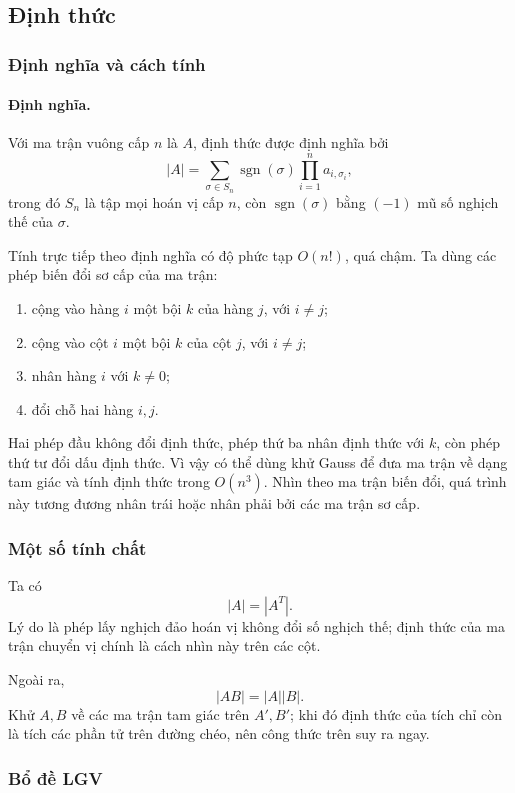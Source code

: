 \documentclass[11pt]{article}
\begin{document}
\subsection{Định thức}

\subsubsection{Định nghĩa và cách tính}

\paragraph{Định nghĩa.}
Với ma trận vuông cấp \(n\) là \(A\), định thức được định nghĩa bởi
\[
  |A|=\sum_{\sigma\in S_n}\operatorname{sgn}(\sigma)
  \prod_{i=1}^n a_{i,\sigma_i},
\]
trong đó \(S_n\) là tập mọi hoán vị cấp \(n\), còn
\(\operatorname{sgn}(\sigma)\) bằng \((-1)\) mũ số nghịch thế của \(\sigma\).

Tính trực tiếp theo định nghĩa có độ phức tạp \(O(n!)\), quá chậm. Ta dùng các
phép biến đổi sơ cấp của ma trận:
\begin{enumerate}
  \item cộng vào hàng \(i\) một bội \(k\) của hàng \(j\), với \(i\ne j\);
  \item cộng vào cột \(i\) một bội \(k\) của cột \(j\), với \(i\ne j\);
  \item nhân hàng \(i\) với \(k\ne 0\);
  \item đổi chỗ hai hàng \(i,j\).
\end{enumerate}
Hai phép đầu không đổi định thức, phép thứ ba nhân định thức với \(k\), còn
phép thứ tư đổi dấu định thức. Vì vậy có thể dùng khử Gauss để đưa ma trận về
dạng tam giác và tính định thức trong \(O(n^3)\). Nhìn theo ma trận biến đổi,
quá trình này tương đương nhân trái hoặc nhân phải bởi các ma trận sơ cấp.

\subsubsection{Một số tính chất}

Ta có
\[
  |A|=|A^T|.
\]
Lý do là phép lấy nghịch đảo hoán vị không đổi số nghịch thế; định thức của ma
trận chuyển vị chính là cách nhìn này trên các cột.

Ngoài ra,
\[
  |AB|=|A||B|.
\]
Khử \(A,B\) về các ma trận tam giác trên \(A',B'\); khi đó định thức của tích
chỉ còn là tích các phần tử trên đường chéo, nên công thức trên suy ra ngay.

\subsubsection{Bổ đề LGV}
\end{document}
